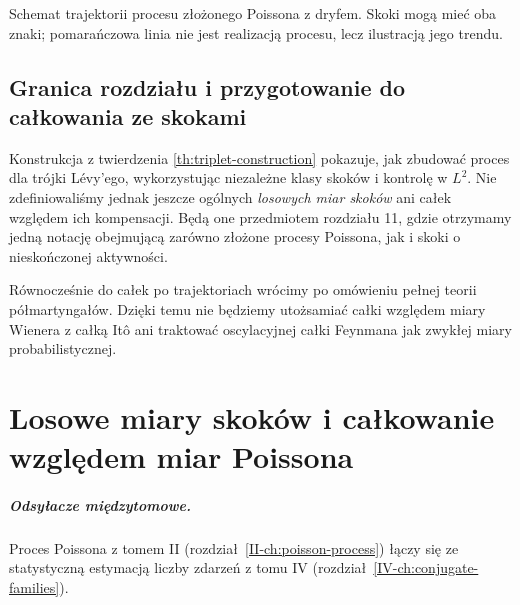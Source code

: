 \documentclass[11pt,a4paper,oneside]{report}
\numberwithin{equation}{chapter}
\theoremstyle{plain}
\theoremstyle{definition}
\theoremstyle{remark}
\begin{document}
\begin{center}
\par\smallskip\small Schemat trajektorii procesu złożonego Poissona
z dryfem. Skoki mogą mieć oba znaki; pomarańczowa linia
nie jest realizacją procesu, lecz ilustracją jego trendu.
\end{center}

\section{Granica rozdziału i przygotowanie do całkowania ze skokami}
Konstrukcja z twierdzenia \ref{th:triplet-construction}
pokazuje, jak zbudować proces dla trójki Lévy'ego,
wykorzystując niezależne klasy skoków i kontrolę w $L^2$.
Nie zdefiniowaliśmy jednak jeszcze ogólnych \emph{losowych
miar skoków} ani całek względem ich kompensacji.
Będą one przedmiotem rozdziału 11, gdzie otrzymamy
jedną notację obejmującą zarówno złożone procesy Poissona,
jak i skoki o nieskończonej aktywności.

Równocześnie do całek po trajektoriach wrócimy po omówieniu
pełnej teorii półmartyngałów. Dzięki temu nie będziemy
utożsamiać całki względem miary Wienera z całką Itô
ani traktować oscylacyjnej całki Feynmana jak zwykłej
miary probabilistycznej.

\chapter{Losowe miary skoków i całkowanie względem miar Poissona}
\label{ch:poisson-random-measure}
\paragraph{Odsyłacze międzytomowe.} Proces Poissona z tomem II (rozdział~\ref{II-ch:poisson-process}) łączy się ze statystyczną estymacją liczby zdarzeń z tomu IV (rozdział~\ref{IV-ch:conjugate-families}).
\end{document}
